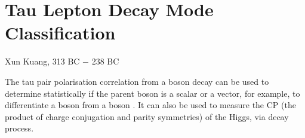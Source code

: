 \chapter{Tau Lepton Decay Mode Classification}
\label{chap:Tau}

%
{Xun Kuang, 313 BC $-$ 238 BC}%

The tau pair polarisation correlation from a boson decay can be used to determine statistically if the parent boson is a  scalar or a vector, for example, to differentiate a \PH boson from  a \PZ boson \cite{Bullock:1991my}. It can also be used to measure the CP (the product of charge conjugation and parity symmetries) of the Higgs, via \HiggsToTauTau decay process\cite{Berge:2015nua}.

